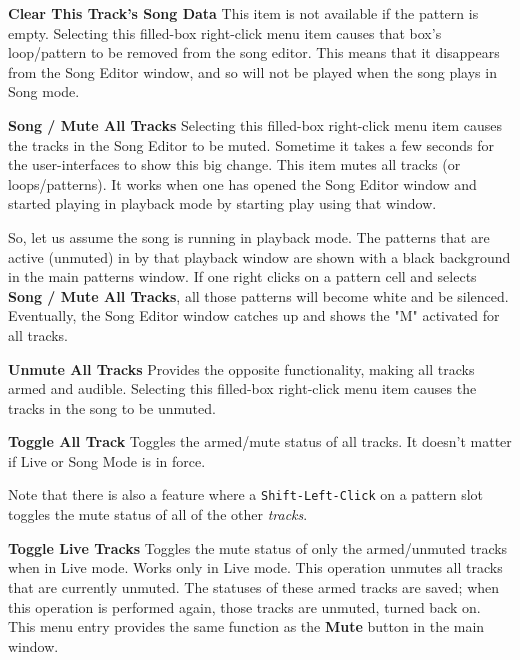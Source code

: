    \textbf{Clear This Track's Song Data}
   This item is not available if the pattern is empty.
   Selecting this filled-box right-click menu item causes that box's
   loop/pattern to be removed from the song editor.  This means
   that it disappears from the Song Editor window, and so will not
   be played when the song plays in Song mode.

   \textbf{Song / Mute All Tracks}
   Selecting this filled-box right-click menu item causes
   the tracks in the Song Editor to be muted.  Sometime it takes a few seconds
   for the user-interfaces to show this big change.
   This item mutes all tracks (or loops/patterns).
   It works when one has opened the Song Editor window
   and started playing in playback
   mode by starting play using that window.

   So, let us assume the song is running in playback mode.  The patterns that
   are active (unmuted) in by that playback window are shown with a black
   background in the main patterns window.  If one right clicks on a pattern
   cell and selects \textbf{Song / Mute All Tracks}, all those patterns
   will become white and be silenced.  Eventually, the Song Editor window
   catches up and shows the "M" activated for all tracks.

   \textbf{Unmute All Tracks}
   Provides the opposite functionality, making all tracks armed and audible.
   Selecting this filled-box right-click menu item causes
   the tracks in the song to be unmuted.


   \textbf{Toggle All Track}
   Toggles the armed/mute status of all tracks.
   It doesn't matter if Live or Song Mode is in force.

   Note that there is also a feature where a
   \texttt{Shift-Left-Click} on a pattern slot toggles the mute
   status of all of the other \textsl{tracks}.

   \textbf{Toggle Live Tracks}
   Toggles the mute status of only the armed/unmuted tracks when in Live mode.
   Works only in Live mode.  This operation unmutes all tracks that are
   currently unmuted.  The statuses of these armed tracks are saved; when
   this operation is performed again, those tracks are unmuted, turned back on.
   This menu entry provides the same function as the \textbf{Mute}
   button in the main window.

